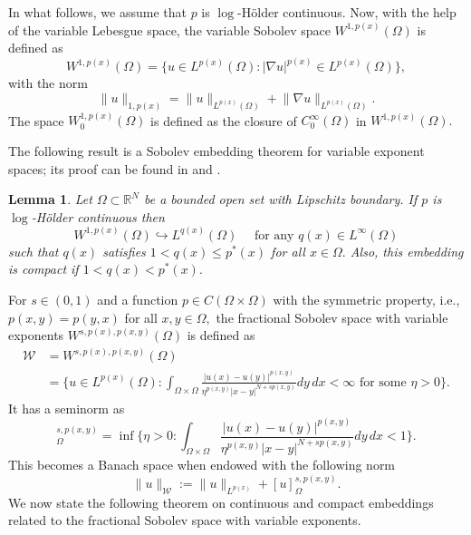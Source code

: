 \documentclass[11pt]{article}
\newtheorem{lemma}{Lemma}[section] %
\newcommand{\om} {\Omega}
\newcommand{\rnn}{\mathbb{R}^{N}}
\newcommand{\lv}{\lVert}
\newcommand{\rv}{\rVert}
\newcommand{\grad}{\nabla}
\begin{document}
In what follows, we assume that
$p$
is
$\log$-Hölder continuous.
Now, with the help of the variable Lebesgue space, 
the variable Sobolev space
$W^{1,p(x)}(\om)$
is defined as
\begin{equation*}
    W^{1,p(x)}(\om) =
\Big \{ u \in L^{p(x)}(\om) : 
    |\grad u|^{p(x)} \in L^{p(x)}(\om) 
\Big \},
\end{equation*}
with the norm
$$
\lv u \rv_{1,p(x)} = \lv u \rv_{L^{p(x)}(\om)} 
+ \lv \grad u \rv_{L^{p(x)}(\om)}.
$$
The space
$W^{1,p(x)}_0(\om)$
is defined as the closure of
$C_0^\infty(\om)$
in
$W^{1,p(x)}(\om).$


The following result is a Sobolev embedding 
theorem for variable exponent spaces; its 
proof can be found in 
\cite{Variable_book} and
\cite{fan_lp_wp_spaces}.


\begin{lemma}\label{lm:Sobolev_embedding}
    Let
$\om\subset\rnn$
be a bounded open set with Lipschitz boundary.
If
$p$
is
$\log$-H\"older continuous then 
    \begin{equation*}
        W^{1,p(x)}(\om)
\hookrightarrow L^{q(x)}(\om) 
\quad\text{ for any }q(x)\in L^\infty(\om)
    \end{equation*}
    such that
$q(x)$
satisfies
$1<q(x)\le p^*(x)$
for all
$x\in\om.$
Also, this embedding is compact if
$1<q(x)< p^*(x).$
\end{lemma}

For
$s\in(0,1)$
and a function
$p \in C(\om \times \om)$
with the symmetric property, i.e.,
$p(x,y) = p(y,x)$
for all
$x,y \in \om,$
the fractional Sobolev space with variable exponents
$W^{s,p(x),p(x,y)}(\om)$
is defined as 
\begin{align*}
 \mathcal{W}
 & =W^{s,p(x),p(x,y)}(\om) \\
 & = 
 \!
\Big \{ u \in L^{p(x)}(\om) : 
\!
\int_{\om \times \om} 
\frac{|u(x) - u(y)|^{p(x,y)}}{\eta^{p(x,y)} 
|x-y|^{N + s p(x,y)}} dy \, dx < \! \infty 
\text{ for some } \eta \! >0
\Big \}.
\end{align*}
It has a seminorm as
\begin{equation*}
    [u]_{\om}^{s,p(x,y)} = \inf 
\Big \{ \eta > 0 : 
\int_{\om \times \om} 
\frac{|u(x) - u(y)|^{p(x,y)}}{\eta^{p(x,y)} 
|x-y|^{N + s p(x,y)}} dy \, dx < 1 
\Big \}.
\end{equation*}
This becomes a Banach space when endowed with 
the following norm 
\begin{equation*}
    \lv u \rv_{\mathcal{W}} := 
    \lv u \rv_{L^{p(x)}} 
    + [u]_{\om}^{s,p(x,y)}.
\end{equation*}
We now state the following theorem on 
continuous and compact embeddings related 
to the fractional Sobolev space with variable exponents.
\end{document}
